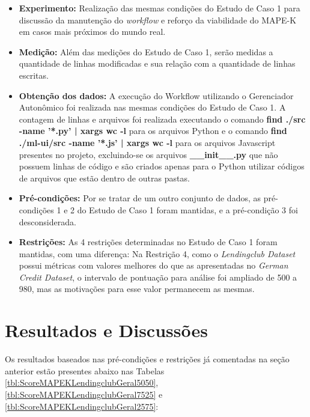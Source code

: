 \documentclass[portugues]{ic-tese}
\begin{document}
\begin{itemize}
\item \textbf{Experimento:} Realização das mesmas condições do Estudo de Caso 1 para discussão da manutenção do \textit{workflow} e reforço da viabilidade do MAPE-K em casos mais próximos do mundo real.

\item \textbf{Medição:} Além das medições do Estudo de Caso 1, serão medidas a quantidade de linhas modificadas e sua relação com a quantidade de linhas escritas.

\item \textbf{Obtenção dos dados:} A execução do Workflow utilizando o Gerenciador Autonômico foi realizada nas mesmas condições do Estudo de Caso 1. A contagem de linhas e arquivos foi realizada executando o comando \textbf{find ./src -name '*.py' | xargs wc -l} para os arquivos Python e o comando \textbf{find ./ml-ui/src -name '*.js' | xargs wc -l} para os arquivos Javascript presentes no projeto, excluindo-se os arquivos \textbf{\_\_init\_\_.py} que não possuem linhas de código e são criados apenas para o Python utilizar códigos de arquivos que estão dentro de outras pastas.

\item \textbf{Pré-condições:} Por se tratar de um outro conjunto de dados, as pré-condições 1 e 2 do Estudo de Caso 1 foram mantidas, e a pré-condição 3 foi desconsiderada.

\item \textbf{Restrições:} As 4 restrições determinadas no Estudo de Caso 1 foram mantidas, com uma diferença: Na Restrição 4, como o \textit{Lendingclub Dataset} possui métricas com valores melhores do que as apresentadas no \textit{German Credit Dataset}, o intervalo de pontuação para análise foi ampliado de 500 a 980, mas as motivações para esse valor permanecem as mesmas.
\end{itemize}

\section{Resultados e Discussões}

Os resultados baseados nas pré-condições e restrições já comentadas na seção anterior estão presentes abaixo nas Tabelas \ref{tbl:ScoreMAPEKLendingclubGeral5050}, \ref{tbl:ScoreMAPEKLendingclubGeral7525} e \ref{tbl:ScoreMAPEKLendingclubGeral2575}:
\end{document}
